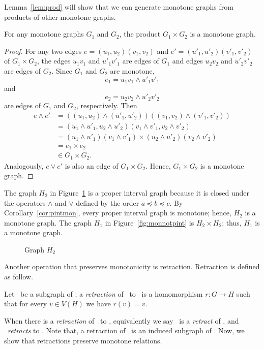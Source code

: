 Lemma~\ref{lem:prod} will show that we can generate monotone graphs from products of other
monotone graphs.

\begin{lemma}\label{lem:prod}
For any monotone graphs \(G_1\) and \(G_2\), the product \(G_1 \times G_2\) is a monotone graph.
\end{lemma}

\begin{proof}
For any two edges \(e = (u_1,u_2)(v_1,v_2)\) and \(e' =(u'_1,u'_2)(v'_1,v'_2)\) of \(G_1\times G_2\),
the edges \(u_1v_1\) and \(u'_1v'_1\) are edges of \(G_1\) and
edges \(u_2v_2\) and \(u'_2v'_2\) are edges of \(G_2\)\@.
Since \(G_1\) and \(G_2\) are monotone,
\[e_1 = u_1v_1 \wedge u'_1v'_1\]
and
\[e_2 = u_2v_2 \wedge u'_2v'_2\]
are edges of \(G_1\) and \(G_2\), respectively. Then
\begin{align*}
e \wedge e' &= ((u_1,u_2)\wedge(u'_1,u'_2))((v_1,v_2)\wedge(v'_1,v'_2)) \\
&= (u_1\wedge u'_1,u_2 \wedge u'_2)(v_1\wedge v'_1,v_2 \wedge v'_2) \\
&= (u_1\wedge u'_1)(v_1\wedge v'_1) \times (u_2\wedge u'_2)(v_2\wedge v'_2) \\
&= e_1 \times e_2 \\
&\in G_1 \times G_2.
\end{align*}
Analogously, \(e \vee e'\) is also an edge of \(G_1\times G_2\)\@. Hence, \(G_1\times G_2\)
is a monotone graph.
\end{proof}

\begin{example}\label{exm:prod}
The graph \(H_2\) in Figure~\ref{fig:pint2} is a proper interval graph because it is
closed under the operators \(\wedge\) and \(\vee\) defined by the order \(a \preceq b \preceq c\)\@.
By Corollary~\ref{cor:pintmon}, every proper interval graph is monotone; hence, \(H_2\) is a monotone graph.
The graph \(H_1\) in Figure~\ref{fig:monnotpint} is \(H_2\times H_2\); thus, \(H_1\) is a monotone graph.
\begin{figure}
\center

\caption{Graph \ensuremath{H_2}}\label{fig:pint2}
\end{figure}
\end{example}

Another operation that preserves monotonicity is retraction. Retraction is defined as follow.

\begin{defi} [Retraction]
Let \mH\ be a subgraph of \mG; a \emph{retraction} of \mG\ to \mH\ is a 
homomorphism \(r: G\to H\) such that for every \(v\in V(H)\) we have
\(r(v) = v\)\@.
\end{defi}
When there is a \emph{retraction} of \mH\ to \mG, equivalently we say
\mH\ is a \emph{retract} of \mG, and \mG\ \emph{retracts} to \mH\@.
Note that, a retraction of \mG\ is an induced subgraph of \mG\@.
Now, we show that retractions preserve monotone relations.

